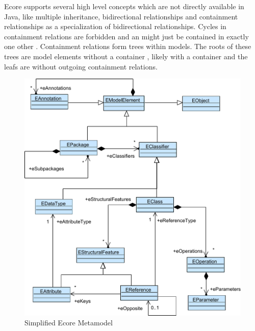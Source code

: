 Ecore supports several high level concepts which are not directly available in Java, like multiple inheritance, bidirectional relationships and containment relationships as a specialization of bidirectional relationships. Cycles in containment relations are forbidden and an  might just be contained in exactly one other . Containment relations form trees within models. The roots of these trees are model elements without a container , likely with a container  and the leafs are  without outgoing containment relations.  

\begin{figure}
\centering
\includegraphics[scale=0.9]{gfx/ex/Ecore} 
\caption{Simplified Ecore Metamodel}
\label{MM:Ecore}
\end{figure}
	

